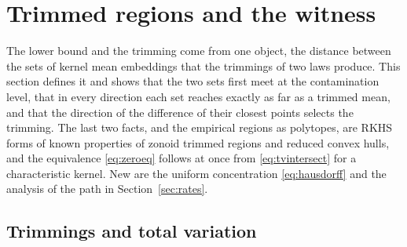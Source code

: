 \section{Trimmed regions and the witness}
\label{sec:regions}

The lower bound and the trimming come from one object, the distance between the sets of kernel mean embeddings that
the trimmings of two laws produce. This section defines it and shows that the two sets first meet at the contamination
level, that in every direction each set reaches exactly as far as a trimmed mean, and that the direction of the
difference of their closest points selects the trimming. The last two facts, and the empirical regions as polytopes, are RKHS
forms of known properties of zonoid trimmed regions and reduced convex hulls, and the equivalence \eqref{eq:zeroeq}
follows at once from \eqref{eq:tvintersect} for a characteristic kernel. New are the uniform concentration
\eqref{eq:hausdorff} and the analysis of the path in Section~\ref{sec:rates}.

\subsection{Trimmings and total variation}

